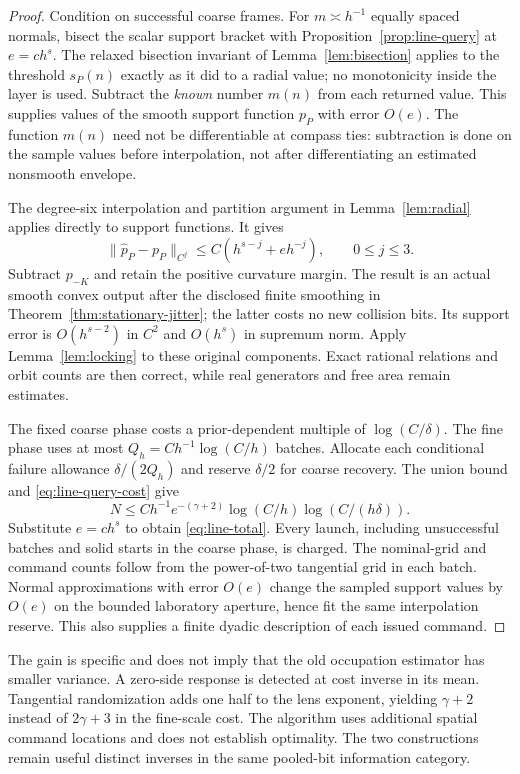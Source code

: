 \begin{proof}
Condition on successful coarse frames. For $m\asymp h^{-1}$ equally
spaced normals, bisect the scalar support bracket with
Proposition~\ref{prop:line-query} at $e=c h^s$.
The relaxed bisection invariant of Lemma~\ref{lem:bisection} applies
to the threshold $s_P(n)$ exactly as it did to a radial value; no
monotonicity inside the layer is used. Subtract the \emph{known}
number $m(n)$ from each returned value. This supplies values of the
smooth support function $p_P$ with error $O(e)$. The function $m(n)$
need not be differentiable at compass ties: subtraction is done on
the sample values before interpolation, not after differentiating an
estimated nonsmooth envelope.

The degree-six interpolation and partition argument in
Lemma~\ref{lem:radial} applies directly to support functions. It gives
\[
 \|\widehat p_P-p_P\|_{C^j}
      \le C(h^{s-j}+eh^{-j}),\qquad 0\le j\le3.
\]
Subtract $p_{-K}$ and retain the positive curvature margin. The result
is an actual smooth convex output after the disclosed finite smoothing
in Theorem~\ref{thm:stationary-jitter}; the latter costs no new
collision bits. Its support error is $O(h^{s-2})$ in $C^2$ and
$O(h^s)$ in supremum norm. Apply Lemma~\ref{lem:locking} to these
original components. Exact rational relations and orbit counts are
then correct, while real generators and free area remain estimates.

The fixed coarse phase costs a prior-dependent multiple of
$\log(C/\delta)$. The fine phase uses at most
$Q_h=C h^{-1}\log(C/h)$ batches. Allocate each conditional failure
allowance $\delta/(2Q_h)$ and reserve $\delta/2$ for coarse recovery.
The union bound and \eqref{eq:line-query-cost} give
\[
 N\le C h^{-1}e^{-(\gamma+2)}
                           \log(C/h)\log(C/(h\delta)).
\]
Substitute $e=c h^s$ to obtain \eqref{eq:line-total}. Every launch,
including unsuccessful batches and solid starts in the coarse phase,
is charged. The nominal-grid and command counts follow from the
power-of-two tangential grid in each batch. Normal approximations with
error $O(e)$ change the sampled support values by $O(e)$ on the bounded
laboratory aperture, hence fit the same interpolation reserve. This
also supplies a finite dyadic description of each issued command.
\end{proof}

The gain is specific and does not imply that the old occupation
estimator has smaller variance. A zero-side response is detected at
cost inverse in its mean. Tangential randomization adds one half to
the lens exponent, yielding $\gamma+2$ instead of $2\gamma+3$ in
the fine-scale cost. The algorithm uses additional spatial command
locations and does not establish optimality. The two constructions
remain useful distinct inverses in the same pooled-bit information
category.

